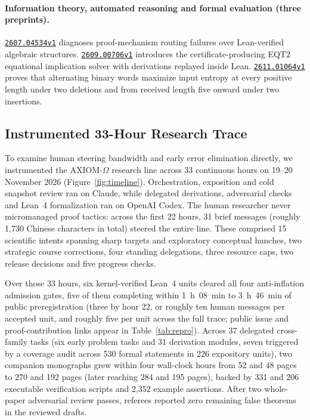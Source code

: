 \documentclass[11pt,a4paper]{article}
\newcommand{\arxiv}[1]{\href{https://arxiv.org/abs/#1}{\texttt{#1}}}
\begin{document}
\paragraph{Information theory, automated reasoning and formal evaluation
(three preprints).}
\arxiv{2607.04534v1} diagnoses proof-mechanism routing failures over
Lean-verified algebraic structures. \arxiv{2609.00706v1} introduces the
certificate-producing EQT2 equational implication solver with derivations
replayed inside Lean. \arxiv{2611.01064v1} proves that alternating binary
words maximize input entropy at every positive length under two deletions and
from received length five onward under two insertions.

\subsection{Instrumented 33-Hour Research Trace}
\label{sec:case}
To examine human steering bandwidth and early error elimination directly, we
instrumented the AXIOM-$\Omega$ research line across 33 continuous hours on
19--20 November 2026 (Figure~\ref{fig:timeline}). Orchestration, exposition
and cold snapshot review ran on Claude, while delegated derivations,
adversarial checks and Lean~4 formalization ran on OpenAI Codex. The human
researcher never micromanaged proof tactics: across the first 22 hours, 31
brief messages (roughly 1,730 Chinese characters in total) steered the entire
line. These comprised 15 scientific intents spanning sharp targets and
exploratory conceptual hunches, two strategic course corrections, four standing
delegations, three resource caps, two release decisions and five progress
checks.



Over those 33 hours, six kernel-verified Lean~4 units cleared all four
anti-inflation admission gates, five of them completing within 1~h~08~min to
3~h~46~min of public preregistration (three by hour 22, or roughly ten human
messages per accepted unit, and roughly five per unit across the full trace;
public issue and proof-contribution links appear in Table~\ref{tab:repro}).
Across 37 delegated cross-family tasks (six early problem tasks and 31
derivation modules, seven triggered by a coverage audit across 530 formal
statements in 226 expository units), two companion monographs grew within four
wall-clock hours from 52 and 48 pages to 270 and 192 pages (later reaching 284
and 195 pages), backed by 331 and 206 executable verification scripts and
2,352 example assertions. After two whole-paper adversarial review passes,
referees reported zero remaining false theorems in the reviewed drafts.
\end{document}
